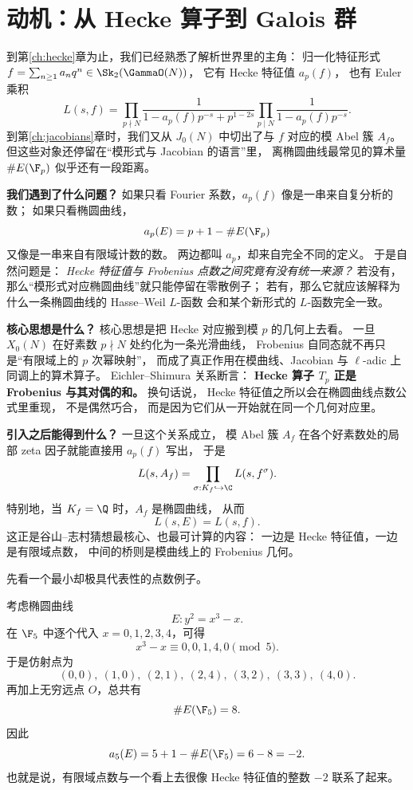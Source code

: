 \section{动机：从 Hecke 算子到 Galois 群}
\label{sec:ch08-motivation}

到第\ref{ch:hecke}章为止，我们已经熟悉了解析世界里的主角：
归一化特征形式 $f=\sum_{n\ge 1}a_nq^n\in \Sk_2(\GammaO(N))$，
它有 Hecke 特征值 $a_p(f)$，
也有 Euler 乘积
\[
  L(s,f)=\prod_{p\nmid N}\frac{1}{1-a_p(f)p^{-s}+p^{1-2s}}
  \prod_{p\mid N}\frac{1}{1-a_p(f)p^{-s}}.
\]
到第\ref{ch:jacobians}章时，我们又从 $J_0(N)$ 中切出了与 $f$ 对应的模 Abel 簇 $A_f$。
但这些对象还停留在“模形式与 Jacobian 的语言”里，
离椭圆曲线最常见的算术量 $\#E(\F_p)$ 似乎还有一段距离。

\textbf{我们遇到了什么问题？}
如果只看 Fourier 系数，$a_p(f)$ 像是一串来自复分析的数；
如果只看椭圆曲线，
\[
  a_p(E)=p+1-\#E(\F_p)
\]
又像是一串来自有限域计数的数。
两边都叫 $a_p$，却来自完全不同的定义。
于是自然问题是：
\emph{Hecke 特征值与 Frobenius 点数之间究竟有没有统一来源？}
若没有，那么“模形式对应椭圆曲线”就只能停留在零散例子；
若有，那么它就应该解释为什么一条椭圆曲线的 Hasse--Weil $L$-函数
会和某个新形式的 $L$-函数完全一致。

\textbf{核心思想是什么？}
核心思想是把 Hecke 对应搬到模 $p$ 的几何上去看。
一旦 $X_0(N)$ 在好素数 $p\nmid N$ 处约化为一条光滑曲线，
Frobenius 自同态就不再只是“有限域上的 $p$ 次幂映射”，
而成了真正作用在模曲线、Jacobian 与 $\ell$-adic 上同调上的算术算子。
Eichler--Shimura 关系断言：
\textbf{Hecke 算子 $T_p$ 正是 Frobenius 与其对偶的和。}
换句话说，
Hecke 特征值之所以会在椭圆曲线点数公式里重现，
不是偶然巧合，
而是因为它们从一开始就在同一个几何对应里。

\textbf{引入之后能得到什么？}
一旦这个关系成立，
模 Abel 簇 $A_f$ 在各个好素数处的局部 zeta 因子就能直接用 $a_p(f)$ 写出，
于是
\[
  L(s,A_f)=\prod_{\sigma:K_f\hookrightarrow \C}L(s,f^\sigma).
\]
特别地，当 $K_f=\Q$ 时，$A_f$ 是椭圆曲线，
从而
\[
  L(s,E)=L(s,f).
\]
这正是谷山--志村猜想最核心、也最可计算的内容：
一边是 Hecke 特征值，一边是有限域点数，
中间的桥则是模曲线上的 Frobenius 几何。



先看一个最小却极具代表性的点数例子。

\begin{example}[曲线 $E:y^2=x^3-x$ 在 $\F_5$ 上]
\label{ex:ch08-f5-point-count}
考虑椭圆曲线
\[
  E\colon y^2=x^3-x.
\]
在 $\F_5$ 中逐个代入 $x=0,1,2,3,4$，可得
\[
  x^3-x\equiv 0,0,1,4,0 \pmod 5.
\]
于是仿射点为
\[
  (0,0),\ (1,0),\ (2,1),\ (2,4),\ (3,2),\ (3,3),\ (4,0).
\]
再加上无穷远点 $O$，总共有
\[
  \#E(\F_5)=8.
\]
因此
\[
  a_5(E)=5+1-\#E(\F_5)=6-8=-2.
\]
也就是说，有限域点数与一个看上去很像 Hecke 特征值的整数 $-2$ 联系了起来。
\end{example}

